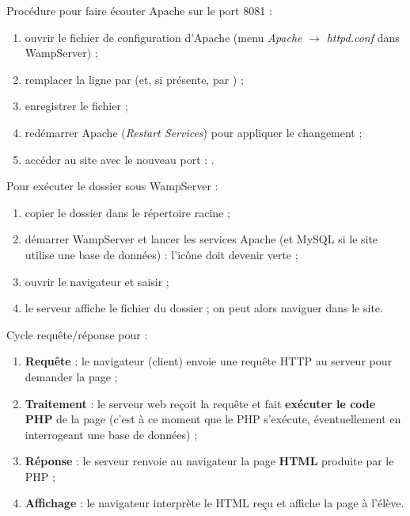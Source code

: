 Procédure pour faire écouter Apache sur le port 8081 :
\begin{enumerate}[label=\arabic*)]
  \item ouvrir le fichier de configuration  d'Apache (menu
        \emph{Apache} $\rightarrow$ \emph{httpd.conf} dans WampServer) ;
  \item remplacer la ligne  par  (et, si présente,
         par ) ;
  \item enregistrer le fichier ;
  \item redémarrer Apache (\emph{Restart Services}) pour appliquer le changement ;
  \item accéder au site avec le nouveau port : .
\end{enumerate}

Pour exécuter le dossier  sous WampServer :
\begin{enumerate}[label=\arabic*)]
  \item copier le dossier  dans le répertoire racine
         ;
  \item démarrer WampServer et lancer les services Apache (et MySQL si le site utilise
        une base de données) : l'icône doit devenir verte ;
  \item ouvrir le navigateur et saisir  ;
  \item le serveur affiche le fichier  du dossier ; on peut alors
        naviguer dans le site.
\end{enumerate}

Cycle requête/réponse pour  :
\begin{enumerate}[label=\arabic*)]
  \item \textbf{Requête} : le navigateur (client) envoie une requête HTTP au serveur
        pour demander la page  ;
  \item \textbf{Traitement} : le serveur web reçoit la requête et fait \textbf{exécuter
        le code PHP} de la page (c'est à ce moment que le PHP s'exécute, éventuellement
        en interrogeant une base de données) ;
  \item \textbf{Réponse} : le serveur renvoie au navigateur la page \textbf{HTML}
        produite par le PHP ;
  \item \textbf{Affichage} : le navigateur interprète le HTML reçu et affiche la page à
        l'élève.
\end{enumerate}

